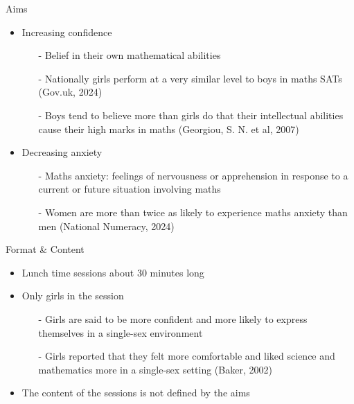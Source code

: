 \documentclass{beamer}  %
\begin{document}
\begin{frame}{Aims}
    \begin{itemize}
        \item Increasing confidence
        \begin{itemize}
            \item[-] Belief in their own mathematical abilities
            \item[-]Nationally girls perform at a very similar level to boys in maths SATs (Gov.uk, 2024)
            \item[-] Boys tend to believe more than girls do that their intellectual abilities cause their high marks in maths (Georgiou, S. N. et al, 2007)
        \end{itemize}
        \item Decreasing anxiety
        \begin{itemize}
            \item[-] Maths anxiety: feelings of nervousness or apprehension in response to a current or future  situation involving maths 
            \item[-]Women are more than twice as likely to experience maths anxiety than men (National Numeracy, 2024) 
        \end{itemize}
    \end{itemize}
\end{frame}


\begin{frame}{Format \& Content}
    \begin{itemize}
        \item Lunch time sessions about 30 minutes long
        \item Only girls in the session
        \begin{itemize}
            \item[-] Girls are said to be more confident and more likely to express themselves in a single-sex environment
            \item[-] Girls reported that they felt more comfortable and liked science and mathematics more
            in a single-sex setting (Baker, 2002)
        \end{itemize}
        \item The content of the sessions is not defined by the aims
    \end{itemize}
\end{frame}

\end{document}
